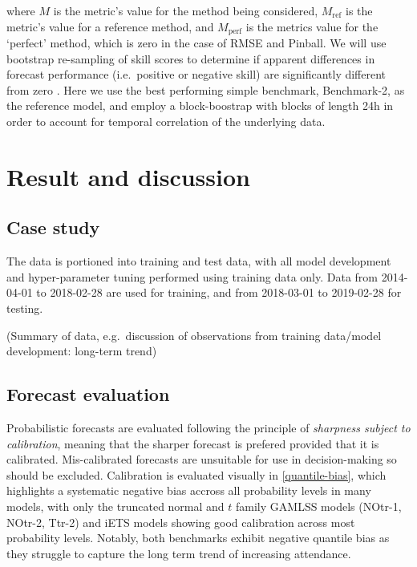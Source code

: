 \documentclass[]{elsarticle} %
\begin{document}
where \(M\) is the metric's value for the method being considered, \(M_\text{ref}\) is the metric's value for a reference method, and \(M_\text{perf}\) is the metrics value for the `perfect' method, which is zero in the case of RMSE and Pinball. We will use bootstrap re-sampling of skill scores to determine if apparent differences in forecast performance (i.e.~positive or negative skill) are significantly different from zero \citep{Efron1981Bootstrap}. Here we use the best performing simple benchmark, Benchmark-2, as the reference model, and employ a block-boostrap with blocks of length 24h in order to account for temporal correlation of the underlying data.

\hypertarget{result}{%
\section{Result and discussion}\label{result}}

\hypertarget{case-study}{%
\subsection{Case study}\label{case-study}}

The data is portioned into training and test data, with all model development and hyper-parameter tuning performed using training data only. Data from 2014-04-01 to 2018-02-28 are used for training, and from 2018-03-01 to 2019-02-28 for testing.

(Summary of data, e.g.~discussion of observations from training data/model development: long-term trend)

\hypertarget{forecast-evaluation}{%
\subsection{Forecast evaluation}\label{forecast-evaluation}}

Probabilistic forecasts are evaluated following the principle of \emph{sharpness subject to calibration}, meaning that the sharper forecast is prefered provided that it is calibrated. Mis-calibrated forecasts are unsuitable for use in decision-making so should be excluded. Calibration is evaluated visually in \ref{quantile-bias}, which highlights a systematic negative bias accross all probability levels in many models, with only the truncated normal and \(t\) family GAMLSS models (NOtr-1, NOtr-2, Ttr-2) and iETS models showing good calibration across most probability levels. Notably, both benchmarks exhibit negative quantile bias as they struggle to capture the long term trend of increasing attendance.
\end{document}
